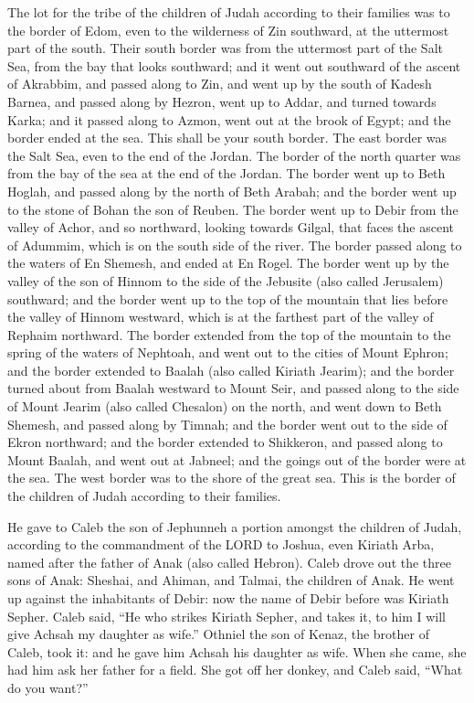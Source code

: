  The lot for the tribe of the children of Judah according to
their families was to the border of Edom, even to the wilderness of Zin
southward, at the uttermost part of the south.  Their south
border was from the uttermost part of the Salt Sea, from the bay that
looks southward;  and it went out southward of the ascent of
Akrabbim, and passed along to Zin, and went up by the south of Kadesh
Barnea, and passed along by Hezron, went up to Addar, and turned towards
Karka;  and it passed along to Azmon, went out at the brook
of Egypt; and the border ended at the sea. This shall be your south
border.  The east border was the Salt Sea, even to the end
of the Jordan. The border of the north quarter was from the bay of the
sea at the end of the Jordan.  The border went up to Beth
Hoglah, and passed along by the north of Beth Arabah; and the border
went up to the stone of Bohan the son of Reuben.  The border
went up to Debir from the valley of Achor, and so northward, looking
towards Gilgal, that faces the ascent of Adummim, which is on the south
side of the river. The border passed along to the waters of En Shemesh,
and ended at En Rogel.  The border went up by the valley of
the son of Hinnom to the side of the Jebusite (also called Jerusalem)
southward; and the border went up to the top of the mountain that lies
before the valley of Hinnom westward, which is at the farthest part of
the valley of Rephaim northward.  The border extended from
the top of the mountain to the spring of the waters of Nephtoah, and
went out to the cities of Mount Ephron; and the border extended to
Baalah (also called Kiriath Jearim);  and the border turned
about from Baalah westward to Mount Seir, and passed along to the side
of Mount Jearim (also called Chesalon) on the north, and went down to
Beth Shemesh, and passed along by Timnah;  and the border
went out to the side of Ekron northward; and the border extended to
Shikkeron, and passed along to Mount Baalah, and went out at Jabneel;
and the goings out of the border were at the sea.  The west
border was to the shore of the great sea. This is the border of the
children of Judah according to their families.

 He gave to Caleb the son of Jephunneh a portion amongst
the children of Judah, according to the commandment of the LORD to
Joshua, even Kiriath Arba, named after the father of Anak (also called
Hebron).  Caleb drove out the three sons of Anak: Sheshai,
and Ahiman, and Talmai, the children of Anak.  He went up
against the inhabitants of Debir: now the name of Debir before was
Kiriath Sepher.  Caleb said, ``He who strikes Kiriath
Sepher, and takes it, to him I will give Achsah my daughter as wife.''
 Othniel the son of Kenaz, the brother of Caleb, took it:
and he gave him Achsah his daughter as wife.  When she
came, she had him ask her father for a field. She got off her donkey,
and Caleb said, ``What do you want?''


